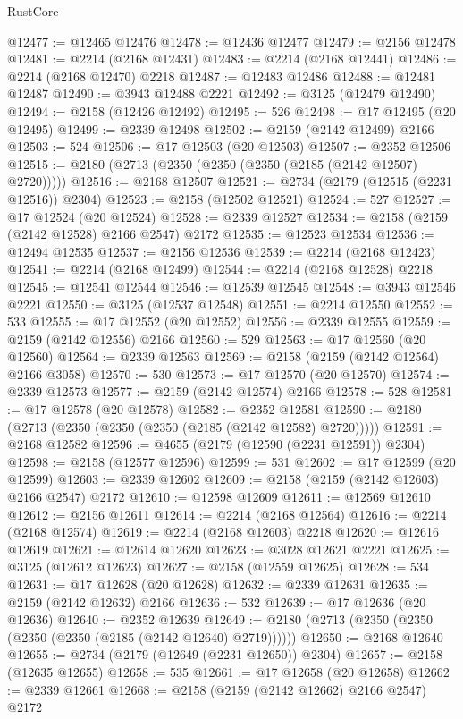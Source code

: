 \begin{lexlean}{RustCore}
\begin{coremodule}
@12477 := @12465 @12476
@12478 := @12436 @12477
@12479 := @2156 @12478
@12481 := @2214 (@2168 @12431)
@12483 := @2214 (@2168 @12441)
@12486 := @2214 (@2168 @12470) @2218
@12487 := @12483 @12486
@12488 := @12481 @12487
@12490 := @3943 @12488 @2221
@12492 := @3125 (@12479 @12490)
@12494 := @2158 (@12426 @12492)
@12495 := 526
@12498 := @17 @12495 (@20 @12495)
@12499 := @2339 @12498
@12502 := @2159 (@2142 @12499) @2166
@12503 := 524
@12506 := @17 @12503 (@20 @12503)
@12507 := @2352 @12506
@12515 := @2180 (@2713 (@2350 (@2350 (@2350 (@2185 (@2142 @12507) @2720)))))
@12516 := @2168 @12507
@12521 := @2734 (@2179 (@12515 (@2231 @12516)) @2304)
@12523 := @2158 (@12502 @12521)
@12524 := 527
@12527 := @17 @12524 (@20 @12524)
@12528 := @2339 @12527
@12534 := @2158 (@2159 (@2142 @12528) @2166 @2547) @2172
@12535 := @12523 @12534
@12536 := @12494 @12535
@12537 := @2156 @12536
@12539 := @2214 (@2168 @12423)
@12541 := @2214 (@2168 @12499)
@12544 := @2214 (@2168 @12528) @2218
@12545 := @12541 @12544
@12546 := @12539 @12545
@12548 := @3943 @12546 @2221
@12550 := @3125 (@12537 @12548)
@12551 := @2214 @12550
@12552 := 533
@12555 := @17 @12552 (@20 @12552)
@12556 := @2339 @12555
@12559 := @2159 (@2142 @12556) @2166
@12560 := 529
@12563 := @17 @12560 (@20 @12560)
@12564 := @2339 @12563
@12569 := @2158 (@2159 (@2142 @12564) @2166 @3058)
@12570 := 530
@12573 := @17 @12570 (@20 @12570)
@12574 := @2339 @12573
@12577 := @2159 (@2142 @12574) @2166
@12578 := 528
@12581 := @17 @12578 (@20 @12578)
@12582 := @2352 @12581
@12590 := @2180 (@2713 (@2350 (@2350 (@2350 (@2185 (@2142 @12582) @2720)))))
@12591 := @2168 @12582
@12596 := @4655 (@2179 (@12590 (@2231 @12591)) @2304)
@12598 := @2158 (@12577 @12596)
@12599 := 531
@12602 := @17 @12599 (@20 @12599)
@12603 := @2339 @12602
@12609 := @2158 (@2159 (@2142 @12603) @2166 @2547) @2172
@12610 := @12598 @12609
@12611 := @12569 @12610
@12612 := @2156 @12611
@12614 := @2214 (@2168 @12564)
@12616 := @2214 (@2168 @12574)
@12619 := @2214 (@2168 @12603) @2218
@12620 := @12616 @12619
@12621 := @12614 @12620
@12623 := @3028 @12621 @2221
@12625 := @3125 (@12612 @12623)
@12627 := @2158 (@12559 @12625)
@12628 := 534
@12631 := @17 @12628 (@20 @12628)
@12632 := @2339 @12631
@12635 := @2159 (@2142 @12632) @2166
@12636 := 532
@12639 := @17 @12636 (@20 @12636)
@12640 := @2352 @12639
@12649 := @2180 (@2713 (@2350 (@2350 (@2350 (@2350 (@2185 (@2142 @12640) @2719))))))
@12650 := @2168 @12640
@12655 := @2734 (@2179 (@12649 (@2231 @12650)) @2304)
@12657 := @2158 (@12635 @12655)
@12658 := 535
@12661 := @17 @12658 (@20 @12658)
@12662 := @2339 @12661
@12668 := @2158 (@2159 (@2142 @12662) @2166 @2547) @2172

\end{coremodule}
\end{lexlean}
